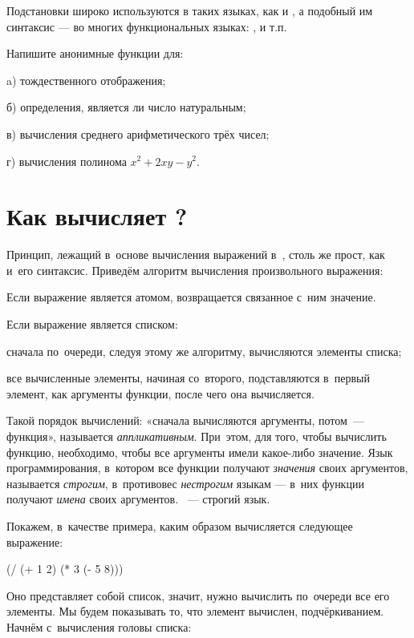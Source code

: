 Подстановки широко используются в таких языках, как  и , а подобный им синтаксис --- во многих функциональных языках: ,   и т.п.


\begin{Assignment}
Напишите анонимные функции для:

a) тождественного отображения;

б) определения, является ли число натуральным;

в) вычисления среднего арифметического трёх чисел;

г) вычисления полинома $x^2 + 2 x y - y^2$.
\end{Assignment}


\section{Как вычисляет \Scheme?}\label{applicative-order}%
Принцип, лежащий в~основе вычисления выражений в~\Scheme, столь же прост, как и~его синтаксис. Приведём алгоритм вычисления произвольного выражения:


\begin{Algorythm}
  \item Если выражение является атомом, возвращается связанное с~ним значение.
  \item Если выражение является списком:
  \begin{Algorythm}
    \item сначала по~очереди, следуя этому же алгоритму, вычисляются элементы списка;
    \item все вычисленные элементы, начиная со~второго, подставляются в~первый элемент, как аргументы функции, после чего она вычисляется.
  \end{Algorythm}
\end{Algorythm}

Такой порядок вычислений: «сначала вычисляются аргументы, потом~--- функция», называется \emph{аппликативным}. При~этом, для того, чтобы вычислить функцию, необходимо, чтобы все аргументы имели какое-либо значение. Язык программирования, в~котором все функции получают \emph{значения} своих аргументов, называется \emph{строгим}, в~противовес \emph{нестрогим} языкам --- в~них функции получают \emph{имена} своих аргументов. \Scheme~--- строгий язык.

Покажем, в~качестве примера, каким образом вычисляется следующее выражение:
\begin{SchemeCode}
(/ (+ 1 2) (* 3 (- 5 8)))
\end{SchemeCode}
Оно представляет собой список, значит, нужно вычислить по~очереди все его элементы. Мы будем показывать то, что элемент вычислен, подчёркиванием. Начнём с~вычисления головы списка:
\newcommand{\ub}[1]{\underbar{#1}}

